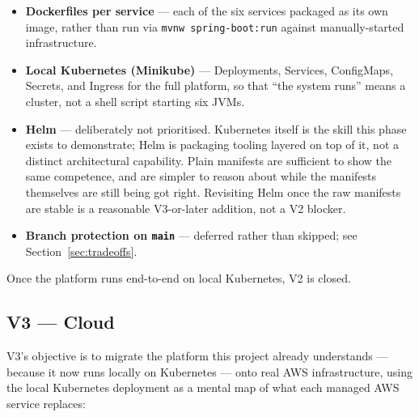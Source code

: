\begin{itemize}
    \item \textbf{Dockerfiles per service} --- each of the six services packaged as its own image, rather than run via \texttt{mvnw spring-boot:run} against manually-started infrastructure.
    \item \textbf{Local Kubernetes (Minikube)} --- Deployments, Services, ConfigMaps, Secrets, and Ingress for the full platform, so that ``the system runs'' means a cluster, not a shell script starting six JVMs.
    \item \textbf{Helm} --- deliberately not prioritised. Kubernetes itself is the skill this phase exists to demonstrate; Helm is packaging tooling layered on top of it, not a distinct architectural capability. Plain manifests are sufficient to show the same competence, and are simpler to reason about while the manifests themselves are still being got right. Revisiting Helm once the raw manifests are stable is a reasonable V3-or-later addition, not a V2 blocker.
    \item \textbf{Branch protection on \texttt{main}} --- deferred rather than skipped; see Section~\ref{sec:tradeoffs}.
\end{itemize}

Once the platform runs end-to-end on local Kubernetes, V2 is closed.

\subsection{V3 --- Cloud}

V3's objective is to migrate the platform this project already understands --- because it now runs locally on Kubernetes --- onto real AWS infrastructure, using the local Kubernetes deployment as a mental map of what each managed AWS service replaces:

